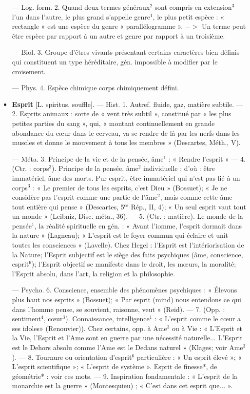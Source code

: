 \begin{itemize}[leftmargin=1cm, label=, itemsep=1pt]
— Log. form. 2. Quand deux termes
généraux$^2$ sont compris en extension$^3$ l’un dans l’autre, le plus grand
s'appelle genre$^1$, le plus petit espèce :
« rectangle » est une espèce du genre
« parallélogramme ». $->$ Un terme
peut être espèce par rapport à un
autre et genre par rapport à un troisième.

— Biol. 3. Groupe d'êtres vivants
présentant certains caractères bien
définis qui constituent un type
héréditaire, gén. impossible à modifier par le croisement.

— Phys. 4. Espèce chimique
corps chimiquement défini.

\item {\bf Esprit} [L. spiritus, souffle]. — Hist.
1. Autref. fluide, gaz, matière
subtile. — 2. Esprits animaux : sorte
de « vent très subtil », constitué
par « les plus petites parties du
sang », qui, « montant continuellement en grande abondance du
cœur dans le cerveau, va se rendre
de là par les nerfs dans les muscles
et donne le mouvement à tous les
membres » (Descartes, Méth., V).

— Méta. 3. Principe de la vie et de
la pensée, âme$^1$ : « Rendre l'esprit »
— 4. (Ctr. : corps$^3$). Principe de la
pensée, âme$^2$ individuelle ; d'où :
être immatériel, âme des morts.
Pur esprit, être immatériel qui n’est
pas lié à un corps$^3$ : « Le premier de
tous les esprits, c’est Dieu » (Bossuet); « Je ne considère pas l'esprit
comme une partie de l'âme$^2$, mais
comme cette âme tout entière qui
pense » (Descartes, 5$^\text{es}$ Rép., II, 4);
« Un seul esprit vaut tout un monde »
(Leibniz, Disc. méta., 36). — 5. (Ctr. :
matière). Le monde de la pensée$^1$, la
réalité spirituelle en gén. : « Avant
l’iomme, l'esprit dormait dans la
nature » (Lagneau); « L'esprit est
le foyer commun qui éclaire et unit
toutes les consciences » (Lavelle).
Chez Hegel : l'Esprit est l’intériorisation
de la Nature; l'Esprit subjectif est le siège des faits psychiques
(âme, conscience, esprit$^6$); l'Esprit
objectif se manifeste dans le droit,
les mœurs, la moralité; l'Esprit
absolu, dans l’art, la religion et la
philosophie.

— Psycho. 6. Conscience, ensemble des phénomènes psychiques :
« Élevons plus haut nos esprits »
(Bossuet); « Par esprit (mind) nous
entendons ce qui dans l’homme
pense, se souvient, raisonne, veut »
(Reid). — 7. (Opp. : sentiment$^4$,
cœur$^3$). Connaissance, intelligence$^1$ :
« L'esprit comme le cœur a ses idoles»
(Renouvier)). Chez certains, opp. à
Ame$^3$ ou à Vie : « L'Esprit et la Vie,
l'Esprit et l'Ame sont en guerre par
une nécessité naturelle... L'Esprit
est le Dehors absolu comme l’Ame
est le Dedans naturel » (Klages;
voir Ame$^3$). — 8. Tournure ou orientation d’esprit$^6$ particulière : « Un
esprit élevé »; « L'esprit scientifique »; « L'esprit de système ».
Esprit de finesse*, de géométrie* :
voir ces mots. — 9. Inspiration
fondamentale : « L’esprit de la monarchie est la guerre » (Montesquieu) ; « C’est dans cet esprit que... ».


\end{itemize}
